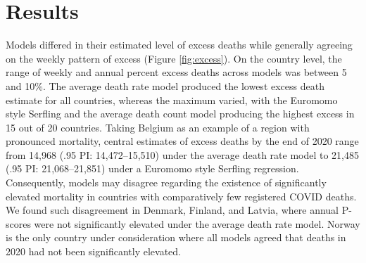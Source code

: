 \documentclass[12pt]{article}
\begin{document}
\section*{Results}


Models differed in their estimated level of excess deaths while generally agreeing on the weekly pattern of excess (Figure \ref{fig:excess}). On the country level, the range of weekly and annual percent excess deaths across models was between 5 and 10\%. The average death rate model produced the lowest excess death estimate for all countries, whereas the maximum varied, with the Euromomo style Serfling and the average death count model producing the highest excess in 15 out of 20 countries. Taking Belgium as an example of a region with pronounced mortality, central estimates of excess deaths by the end of 2020 range from 14,968 (.95 PI: 14,472--15,510) under the average death rate model to 21,485 (.95 PI: 21,068--21,851) under a Euromomo style Serfling regression. Consequently, models may disagree regarding the existence of significantly elevated mortality in countries with comparatively few registered COVID deaths. We found such disagreement in Denmark, Finland, and Latvia, where annual P-scores were not significantly elevated under the average death rate model. Norway is the only country under consideration where all models agreed that deaths in 2020 had not been significantly elevated.
\end{document}
